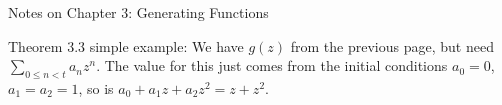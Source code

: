 \topglue 0.5in
\centerline{Notes on Chapter 3: Generating Functions}
\vskip 0.3in
\vskip 0.2in

\noindent [p 106] Theorem 3.3 simple example: We have
$g\left(z\right)$ from the previous page, but need
$\sum_{0 \le n < t} a_n z^n$.  The value for this just comes from
the initial conditions $a_0 = 0$, $a_1 = a_2 = 1$, so is
$a_0 + a_1 z + a_2 z^2 = z + z^2$.

\bye